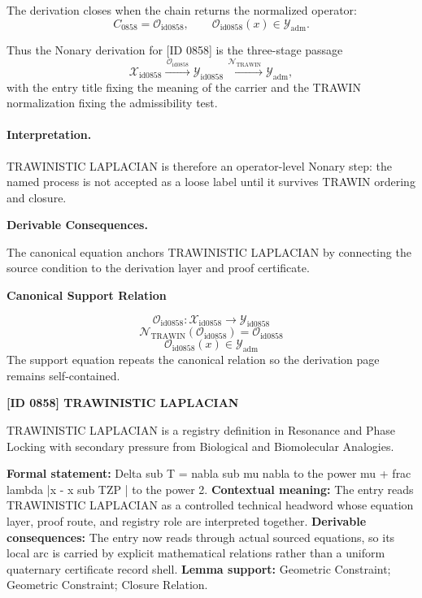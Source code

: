 The derivation closes when the chain returns the normalized operator:\[
C_{0858}=\mathcal{O}_{\mathrm{id0858}},\qquad \mathcal{O}_{\mathrm{id0858}}(x)\in\mathcal{Y}_{\mathrm{adm}}.
\]

Thus the Nonary derivation for [ID 0858] is the three-stage passage
\[
\mathcal{X}_{\mathrm{id0858}}\xrightarrow{\,\mathcal{O}_{\mathrm{id0858}}\,} \mathcal{Y}_{\mathrm{id0858}}\xrightarrow{\,\mathcal{N}_{\mathrm{TRAWIN}}\,} \mathcal{Y}_{\mathrm{adm}},
\]
with the entry title fixing the meaning of the carrier and the TRAWIN normalization fixing the admissibility test.

\paragraph{Interpretation.} TRAWINISTIC LAPLACIAN is therefore an operator-level Nonary step: the named process is not accepted as a loose label until it survives TRAWIN ordering and closure.

\par\vspace{0.35em}
\noindent\textbf{Derivable Consequences.}\quad
\begingroup
\footnotesize
\raggedright
The canonical equation anchors TRAWINISTIC LAPLACIAN by connecting the source condition to the derivation layer and proof certificate.
\par\endgroup

\noindent\textbf{Canonical Support Relation}\par
\[
\mathcal{O}_{\mathrm{id0858}}:\mathcal{X}_{\mathrm{id0858}}\longrightarrow\mathcal{Y}_{\mathrm{id0858}}
\]
\[
\mathcal{N}_{\mathrm{TRAWIN}}(\mathcal{O}_{\mathrm{id0858}})=\mathcal{O}_{\mathrm{id0858}}
\]
\[
\mathcal{O}_{\mathrm{id0858}}(x)\in\mathcal{Y}_{\mathrm{adm}}
\]
\noindent The support equation repeats the canonical relation so the derivation page remains self-contained.\par

\clearpage
\noindent\textbf{[ID 0858] TRAWINISTIC LAPLACIAN}\par
\vspace{0.35em}
\begingroup\small
{}
TRAWINISTIC LAPLACIAN is a registry definition in Resonance and Phase Locking with secondary pressure from Biological and Biomolecular Analogies.

\begingroup\footnotesize\setlength{\emergencystretch}{3em}\sloppy
\textbf{Formal statement:} Delta sub T = nabla sub mu nabla to the power mu + frac lambda |x - x sub TZP | to the power 2. \textbf{Contextual meaning:} The entry reads TRAWINISTIC LAPLACIAN as a controlled technical headword whose equation layer, proof route, and registry role are interpreted together. \textbf{Derivable consequences:} The entry now reads through actual sourced equations, so its local arc is carried by explicit mathematical relations rather than a uniform quaternary certificate record shell. \textbf{Lemma support:} Geometric Constraint; Geometric Constraint; Closure Relation.\par
\endgroup

